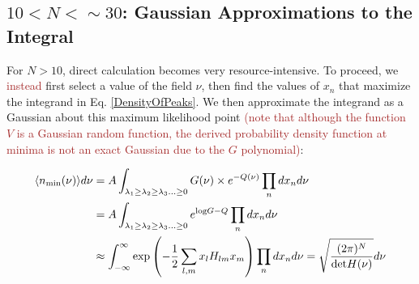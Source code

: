 \documentclass[12pt]{article}
\newcommand{\sh}[1]{\textcolor{brown}{#1}}
\begin{document}

\subsection{$10 < N < \sim30$: Gaussian Approximations to the Integral}

For $N>10$, direct calculation becomes very resource-intensive. To proceed, we \sh{instead} first select a value of the field $\nu$, then find the values of $x_n$ that maximize the integrand in Eq. \ref{DensityOfPeaks}. We then approximate the integrand as a Gaussian about this maximum likelihood point \sh{(note that although the function $V$ is a Gaussian random function, the derived probability density function at minima is not an exact Gaussian due to the $G$ polynomial)}:

\begin{align*}
\begin{split}
\langle n_{\rm min}(\nu)\rangle d\nu &= A \int_{\lambda_1 \geq \lambda_2 \geq \lambda_3 \ldots \geq 0} G(\nu) \times e^{-Q(\nu)} \prod_n dx_n d\nu\\
&=A\int_{\lambda_1 \geq \lambda_2 \geq \lambda_3 \ldots \geq 0} e^{\mathrm{log}G-Q} \prod_n dx_n d\nu\\
&\approx \int_{-\infty}^{\infty} \exp\left(-\frac{1}{2}\sum_{l,m}x_lH_{lm}x_m\right)  \prod_n dx_n d\nu = \sqrt{\frac{(2\pi)^N}{\mathrm{det} H(\nu)}}d\nu
\end{split}
\end{align*}
\end{document}
